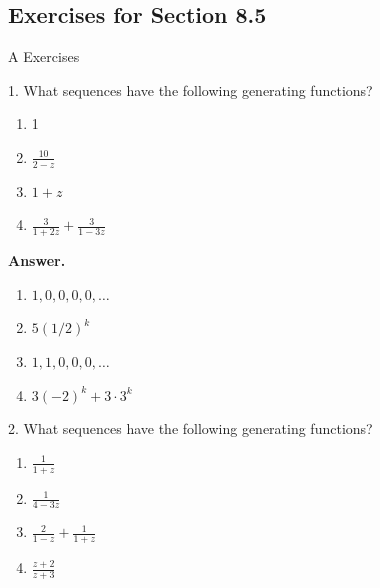 \documentclass[10pt,]{book}
\theoremstyle{plain}
\theoremstyle{definition}
\theoremstyle{definition}
\theoremstyle{definition}
\theoremstyle{definition}
\numberwithin{equation}{section}
\begin{document}
\subsection[Exercises for Section 8.5]{Exercises for Section 8.5}\label{exercises-2}
\hypertarget{exercisegroup-3}{}\typeout{************************************************}
\typeout{************************************************}
A Exercises%
\begin{exercisegroup}
\item[1.]\hypertarget{exercise-7}{}What sequences have the following generating functions?%
\par
\leavevmode%
\begin{enumerate}[label=\alph*]
\item\hypertarget{li-108}{} 1%
\item\hypertarget{li-109}{}\(\frac{10}{2-z}\)%
\item\hypertarget{li-110}{} \(1 + z\)%
\item\hypertarget{li-111}{} \(\frac{3}{1+2z}+ \frac{3}{1-3z}\)%
\end{enumerate}
%
\par\smallskip
\par\smallskip
\noindent\textbf{Answer.}\hypertarget{answer-4}{}\quad
\leavevmode%
\begin{enumerate}[label=\alph*]
\item\hypertarget{li-112}{} \(1,0,0,0,0,\ldots\)%
\item\hypertarget{li-113}{} \(5(1/2)^k\) %
\item\hypertarget{li-114}{} \(1,1,0,0,0,\ldots\)%
\item\hypertarget{li-115}{} \(3(-2)^k+3\cdot 3^k\)%
\end{enumerate}
%
\item[2.]\hypertarget{exercise-8}{}What sequences have the following generating functions?%
\par
\leavevmode%
\begin{enumerate}[label=\alph*]
\item\hypertarget{li-116}{}\(\frac{1}{1+z}\)%
\item\hypertarget{li-117}{} \(\frac{1}{4-3z}\)%
\item\hypertarget{li-118}{}\(\frac{2}{1-z}+ \frac{1}{1+z}\)%
\item\hypertarget{li-119}{}\(\frac{z+2}{z+3}\)%
\end{enumerate}
%
\par\smallskip
\end{exercisegroup}
\end{document}
